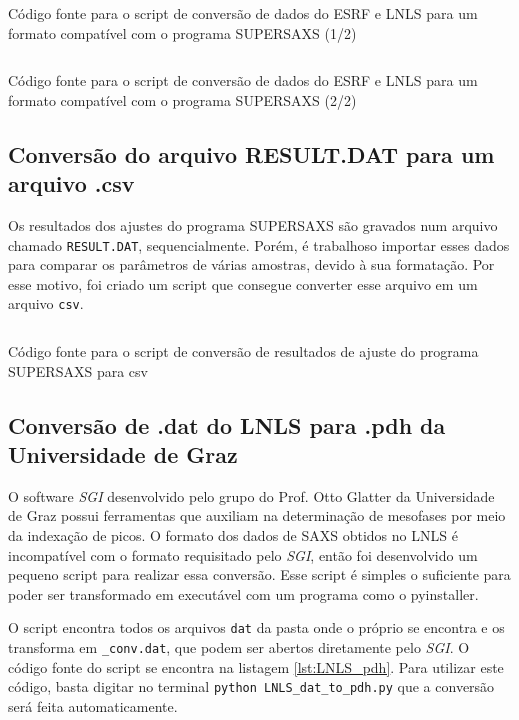 \begin{apendicesenv}
\begin{listing}[H]
	\inputminted{python}{./python/converting_files1.py}
	\caption{Código fonte para o script de conversão de dados do ESRF e LNLS para um formato compatível com o programa SUPERSAXS (1/2)}  
	\label{lst:conversao_supersaxs1}
\end{listing}

\begin{listing}[H]
	\inputminted{python}{./python/converting_files2.py}
	\caption{Código fonte para o script de conversão de dados do ESRF e LNLS para um formato compatível com o programa SUPERSAXS (2/2)}  
	\label{lst:conversao_supersaxs2}
\end{listing}

\subsection{Conversão do arquivo RESULT.DAT para um arquivo .csv}

Os resultados dos ajustes do programa SUPERSAXS são gravados num arquivo chamado \texttt{RESULT.DAT}, sequencialmente. Porém, é trabalhoso importar esses dados para comparar os parâmetros de várias amostras, devido à sua formatação. Por esse motivo, foi criado um script que consegue converter esse arquivo em um arquivo \texttt{csv}.

\begin{listing}[H]
	\inputminted{python}{./python/converting_results.py}
	\caption{Código fonte para o script de conversão de resultados de ajuste do programa SUPERSAXS para csv}  
	\label{lst:conversao_resultados}
\end{listing}

\subsection{Conversão de .dat do LNLS para .pdh da Universidade de Graz}

O software \emph{SGI} desenvolvido pelo grupo do Prof. Otto Glatter da Universidade de Graz possui ferramentas que auxiliam na determinação de mesofases por meio da indexação de picos. O formato dos dados de SAXS obtidos no LNLS é incompatível com o formato requisitado pelo \emph{SGI}, então foi desenvolvido um pequeno script para realizar essa conversão. Esse script é simples o suficiente para poder ser transformado em executável com um programa como o pyinstaller.

O script encontra todos os arquivos \texttt{dat} da pasta onde o próprio se encontra e os transforma em \texttt{\_conv.dat}, que podem ser abertos diretamente pelo \emph{SGI}. O código fonte do script se encontra na listagem \ref{lst:LNLS_pdh}. Para utilizar este código, basta digitar no terminal \texttt{python LNLS\_dat\_to\_pdh.py} que a conversão será feita automaticamente.


\end{apendicesenv}
